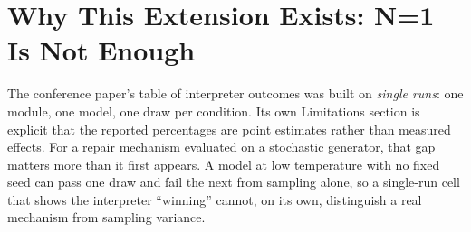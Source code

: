 \documentclass[11pt]{article}
\begin{document}
\begin{abstract}
string checks with a structural benchmark-aware interface, and report the
defects as a methodological caution for the subfield. Finally, having
established where the interpreter acts, we asked whether STITCH is useful on
real hardware, and found that it catches the defects a simulation-only loop
signs off. On an independently developed RISC-V MPSoC with a mesh
network-on-chip ($990$ runs, six models from $3$B to $14$B), a
simulation-only repair loop signs off $62\%$ of its runs with synthesis defects
intact, and STITCH brings that to $1\%$; interpreting the lint and synthesis
output beats showing it raw by $14.6$ points (cell-level $95\%$ CI $+3.5$ to
$+26.3$) with about $23\%$ fewer model calls and tokens; escalation reaches the
highest clean pass rate ($80\%$); and the repaired leaf modules restore
top-level synthesis of $4$- and $9$-router meshes, which simulation-only
repair never achieves. An additive, regression-gated interpreter upgrade
driven by those designs shows how STITCH's vocabulary can keep growing. The
contribution is not that STITCH
works in more places, but that we now know \emph{when} it works, \emph{how
much} it helps, \emph{at what cost}, and \emph{for which models}, on
replicated, tier-decomposed evidence rather than single-draw pooled averages.
\end{abstract}

\section{Why This Extension Exists: N=1 Is Not Enough}
\label{sec:why}

The conference paper's table of interpreter outcomes was built on
\emph{single runs}: one module, one model, one draw per condition. Its own
Limitations section is explicit that the reported percentages are point
estimates rather than measured effects. For a repair mechanism evaluated on a
stochastic generator, that gap matters more than it first appears. A model at
low temperature with no fixed seed can pass one draw and fail the next from
sampling alone, so a single-run cell that shows the interpreter ``winning''
cannot, on its own, distinguish a real mechanism from sampling variance.
\end{document}
